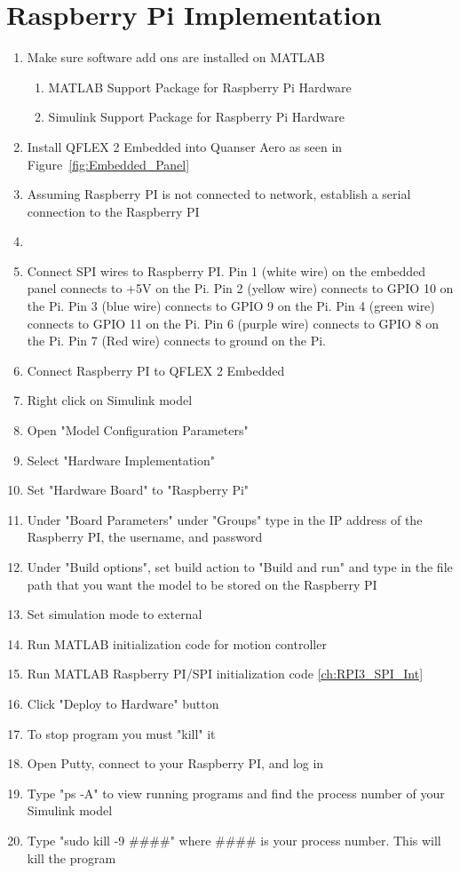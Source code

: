 \section{Raspberry Pi Implementation}
\begin{enumerate}
    \item Make sure software add ons are installed on MATLAB
    \begin{enumerate}
        \item MATLAB Support Package for Raspberry Pi Hardware
        \item Simulink Support Package for Raspberry Pi Hardware
    \end{enumerate}
    \item Install QFLEX 2 Embedded into Quanser Aero as seen in Figure~\ref{fig:Embedded_Panel}
    \item Assuming Raspberry PI is not connected to network, establish a serial connection to the Raspberry PI
    \item {}
    \item Connect SPI wires to Raspberry PI. Pin 1 (white wire) on the embedded panel connects to +5V on the Pi.  Pin 2 (yellow wire) connects to GPIO 10 on the Pi. Pin 3 (blue wire) connects to GPIO 9 on the Pi.  Pin 4 (green wire) connects to GPIO 11 on the Pi. Pin 6 (purple wire) connects to GPIO 8 on the Pi.  Pin 7 (Red wire) connects to ground on the Pi.
    \item Connect Raspberry PI to QFLEX 2 Embedded
    \item Right click on Simulink model
    \item Open "Model Configuration Parameters"
    \item Select "Hardware Implementation"
    \item Set "Hardware Board" to "Raspberry Pi"
    \item Under "Board Parameters" under "Groups" type in the IP address of the Raspberry PI, the username, and password
    \item Under "Build options", set build action to "Build and run" and type in the file path that you want the model to be stored on the Raspberry PI
    \item Set simulation mode to external
    \item Run MATLAB initialization code for motion controller
    \item Run MATLAB Raspberry PI/SPI initialization code \ref{ch:RPI3_SPI_Int}
    \item Click "Deploy to Hardware" button
    \item To stop program you must "kill" it
    \item Open Putty, connect to your Raspberry PI, and log in
    \item Type "ps -A" to view running programs and find the process number of your Simulink model
    \item Type "sudo kill -9 \#\#\#\#" where \#\#\#\# is your process number.  This will kill the program
\end{enumerate}

